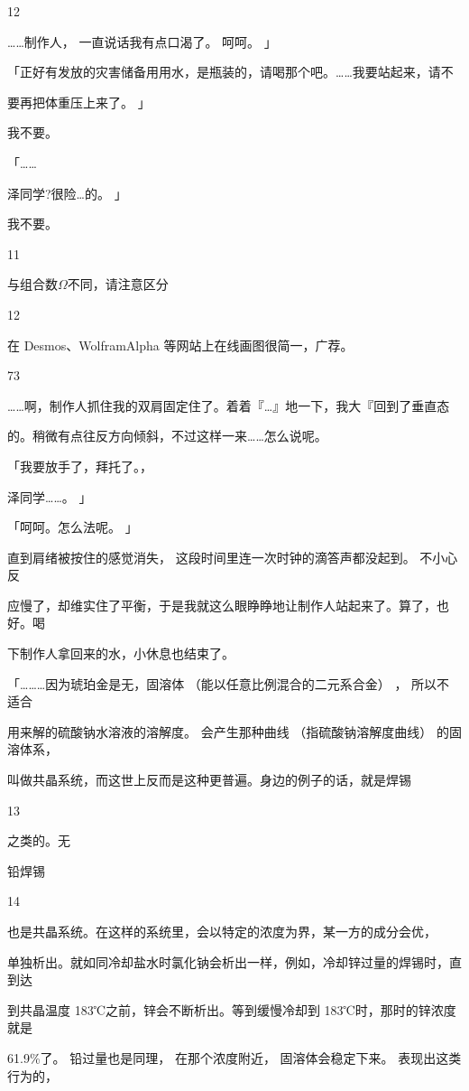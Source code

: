 12\par
……制作人， 一直说话我有点口渴了。 呵呵。 」\par
「正好有发放的灾害储备用用水，是瓶装的，请喝那个吧。……我要站起来，请不\par
要再把体重压上来了。 」\par
我不要。\par
「……\par
泽同学?很险…的。 」\par
我不要。\par
11\par
与组合数$\Omega$不同，请注意区分\par
12\par
在 Desmos、WolframAlpha 等网站上在线画图很简一，广荐。\par

73\par
……啊，制作人抓住我的双肩固定住了。着着『…』地一下，我大『回到了垂直态\par
的。稍微有点往反方向倾斜，不过这样一来……怎么说呢。\par
「我要放手了，拜托了。，\par
泽同学……。 」\par
「呵呵。怎么法呢。 」\par
直到肩绪被按住的感觉消失， 这段时间里连一次时钟的滴答声都没起到。 不小心反\par
应慢了，却维实住了平衡，于是我就这么眼睁睁地让制作人站起来了。算了，也好。喝\par
下制作人拿回来的水，小休息也结束了。\par
「………因为琥珀金是无，固溶体 （能以任意比例混合的二元系合金） ， 所以不适合\par
用来解的硫酸钠水溶液的溶解度。 会产生那种曲线 （指硫酸钠溶解度曲线） 的固溶体系，\par
叫做共晶系统，而这世上反而是这种更普遍。身边的例子的话，就是焊锡\par
13\par
之类的。无\par
铅焊锡\par
14\par
也是共晶系统。在这样的系统里，会以特定的浓度为界，某一方的成分会优，\par
单独析出。就如同冷却盐水时氯化钠会析出一样，例如，冷却锌过量的焊锡时，直到达\par
到共晶温度 183℃之前，锌会不断析出。等到缓慢冷却到 183℃时，那时的锌浓度就是\par
61.9\%了。 铅过量也是同理， 在那个浓度附近， 固溶体会稳定下来。 表现出这类行为的，\par
